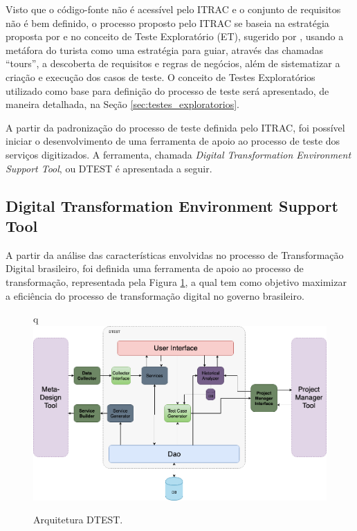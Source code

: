 Visto que o código-fonte não é acessível pelo ITRAC e o conjunto de requisitos não é bem definido, o processo proposto pelo ITRAC se baseia na estratégia proposta por \cite{elcock2006testing} e no conceito de Teste Exploratório (ET), sugerido por \cite{whittaker2009exploratory}, usando a metáfora do turista como uma estratégia para guiar, através das chamadas ``tours'', a descoberta de requisitos e regras de negócios, além de sistematizar a criação e execução dos casos de teste. O conceito de Testes Exploratórios utilizado como base para definição do processo de teste será apresentado, de maneira detalhada, na Seção \ref{sec:testes_exploratorios}.


A partir da padronização do processo de teste definida pelo ITRAC, foi possível iniciar o desenvolvimento de uma ferramenta de apoio ao processo de teste dos serviços digitizados. A ferramenta, chamada \textit{Digital Transformation Environment Support Tool}, ou DTEST é apresentada a seguir.

\subsection[DTEST]{Digital Transformation Environment Support Tool}
\label{sec:dtest}

A partir da análise das características envolvidas no processo de Transformação Digital brasileiro, foi definida uma ferramenta de apoio ao processo de transformação, representada pela Figura \ref{img:architecture}, a qual tem como objetivo maximizar a eficiência do processo de transformação digital no governo brasileiro.

\begin{figure}[!htb]
\centering
q\includegraphics[width=1\textwidth]{figuras/arquitetura_sem_tester.png}
\caption{Arquitetura DTEST.}
\label{img:architecture}
\end{figure}

